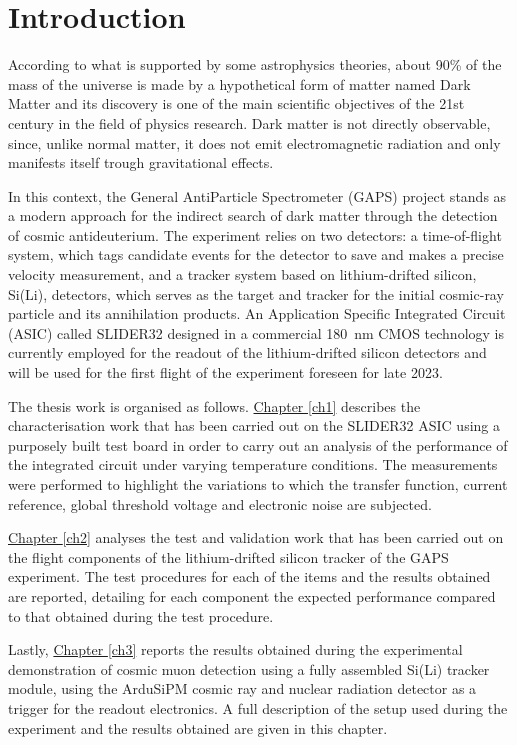 \chapter*{Introduction}  %

\par
According to what is supported by some astrophysics theories, about 90\% of the mass of the universe is made by a hypothetical form of matter named Dark Matter and its discovery is one of the main scientific objectives of the 21st century in the field of physics research. Dark matter is not directly observable, since, unlike normal matter, it does not emit electromagnetic radiation and only manifests itself trough gravitational effects. 

\par
In this context, the General AntiParticle Spectrometer (GAPS) project stands as a modern approach for the indirect search of dark matter through the detection of cosmic antideuterium. The experiment relies on two detectors: a time-of-flight system, which tags candidate events for the detector to save and makes a precise velocity measurement, and a tracker system based on lithium-drifted silicon, Si(Li), detectors, which serves as the target and tracker for the initial cosmic-ray particle and its annihilation products. An Application Specific Integrated Circuit (ASIC) called SLIDER32 designed in a commercial \SI{180}{\nano\meter} CMOS technology is currently employed for the readout of the lithium-drifted silicon detectors and will be used for the first flight of the experiment foreseen for late 2023.

\par
The thesis work is organised as follows. \hyperref[ch1]{Chapter \ref{ch1}} describes the characterisation work that has been carried out on the SLIDER32 ASIC using a purposely built test board in order to carry out an analysis of the performance of the integrated circuit under varying temperature conditions. The measurements were performed to highlight the variations to which the transfer function, current reference, global threshold voltage and electronic noise are subjected.

\par
\hyperref[ch2]{Chapter \ref{ch2}} analyses the test and validation work that has been carried out on the flight components of the lithium-drifted silicon tracker of the GAPS experiment. The test procedures for each of the items and the results obtained are reported, detailing for each component the expected performance compared to that obtained during the test procedure.

\par
Lastly, \hyperref[ch3]{Chapter \ref{ch3}} reports the results obtained during the experimental demonstration of cosmic muon detection using a fully assembled Si(Li) tracker module, using the ArduSiPM cosmic ray and nuclear radiation detector as a trigger for the readout electronics. A full description of the setup used during the experiment and the results obtained are given in this chapter.